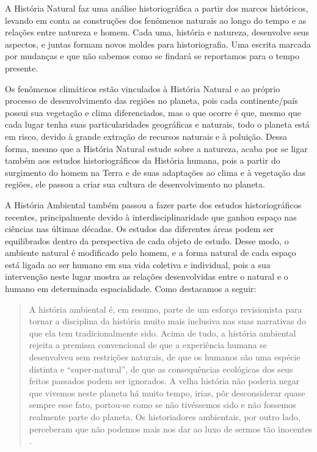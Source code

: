 \begin{refsection}
    A História Natural faz uma análise historiográfica a partir dos marcos históricos, levando em conta as construções dos fenômenos naturais ao longo do tempo e as relações entre natureza e homem. Cada uma, história e natureza, desenvolve seus aspectos, e juntas formam novos moldes para historiografia. Uma escrita marcada por mudanças e que não sabemos como se findará se reportamos para o tempo presente. 

    Os fenômenos climáticos estão vinculados à História Natural e ao próprio processo de desenvolvimento das regiões no planeta, pois cada continente/país possui sua vegetação e clima diferenciados, mas o que ocorre é que, mesmo que cada lugar tenha suas particularidades geográficas e naturais, todo o planeta está em risco, devido à grande extração de recursos naturais e à poluição. Dessa forma, mesmo que a História Natural estude sobre a natureza, acaba por se ligar também aos estudos historiográficos da História humana, pois a partir do surgimento do homem na Terra e de suas adaptações ao clima e à vegetação das regiões, ele passou a criar sua cultura de desenvolvimento no planeta.  

    A História Ambiental também passou a fazer parte dos estudos historiográficos recentes, principalmente devido à interdisciplinaridade que ganhou espaço nas ciências nas últimas décadas. Os estudos das diferentes áreas podem ser equilibrados dentro da perspectiva de cada objeto de estudo. Desse modo, o ambiente natural é modificado pelo homem, e a forma natural de cada espaço está ligada ao ser humano em sua vida coletiva e individual, pois a sua intervenção neste lugar mostra as relações desenvolvidas entre o natural e o humano em determinada espacialidade. Como destacamos a seguir: 

    \begin{quotation}
        A história ambiental é, em resumo, parte de um esforço revisionista para tornar a disciplina da história muito mais inclusiva nas suas narrativas do que ela tem tradicionalmente sido. Acima de tudo, a história ambiental rejeita a premissa convencional de que a experiência humana se desenvolveu sem restrições naturais, de que os humanos são uma espécie distinta e “super-natural”, de que as consequências ecológicas dos seus feitos passados podem ser ignorados. A velha história não poderia negar que vivemos neste planeta há muito tempo, irias, pôr desconsiderar quase sempre esse fato, portou-se como se não tivéssemos sido e não fossemos realmente parte do planeta. Os historiadores ambientais, por outro lado, perceberam que não podemos mais nos dar ao luxo de sermos tão inocentes \cite[p.~2]{WORSTER1991Para}. 
    \end{quotation}


\end{refsection}
